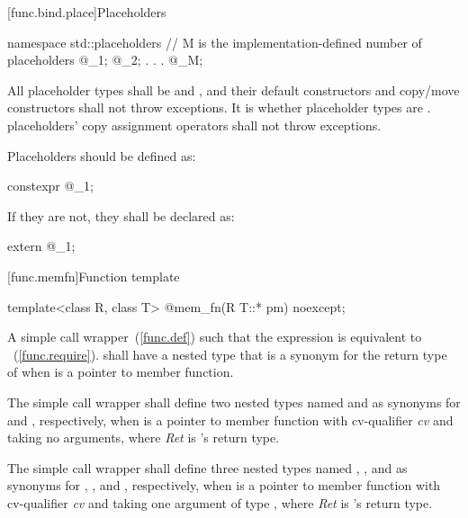 [func.bind.place]{Placeholders}

%
%
\begin{codeblock}
namespace std::placeholders {
  // M is the implementation-defined number of placeholders
  @\seebelow@ _1;
  @\seebelow@ _2;
              .
              .
              .
  @\seebelow@ _M;
}
\end{codeblock}

\pnum
All placeholder types shall be  and
, and their default constructors and copy/move
constructors shall not throw exceptions. It is  whether
placeholder types are .  placeholders' copy
assignment operators shall not throw exceptions.%
%

\pnum
Placeholders should be defined as:
\begin{codeblock}
constexpr @\unspec@ _1{};
\end{codeblock}
If they are not, they shall be declared as:
\begin{codeblock}
extern @\unspec@ _1;
\end{codeblock}

[func.memfn]{Function template }%

%
\begin{itemdecl}
template<class R, class T> @\unspec@ mem_fn(R T::* pm) noexcept;
\end{itemdecl}

\begin{itemdescr}
\pnum
\returns A simple call wrapper~(\ref{func.def}) 
such that the expression  is equivalent
to ~(\ref{func.require}).
 shall have a nested type  that is a synonym
for the return type of  when  is a pointer to
member function.

\pnum
The simple call wrapper shall
define two nested types named  and  as synonyms
for \cv{}  and , respectively,
when  is
a pointer to member function with cv-qualifier \textit{cv} and taking no
arguments, where \textit{Ret} is 's return type.

\pnum
The simple call wrapper shall
define three nested types named ,
, and  as synonyms
for \cv{} , , and , respectively,
when  is
a pointer to member function with cv-qualifier \textit{cv} and taking
one argument of type , where \textit{Ret} is 's return type.
\end{itemdescr}

